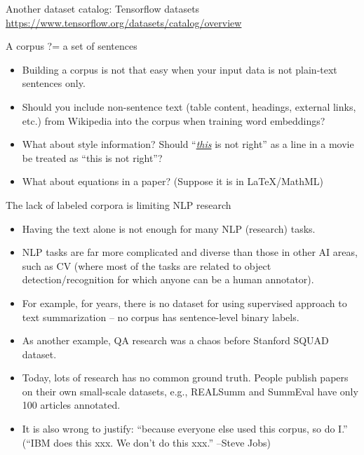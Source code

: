 \documentclass[11pt]{beamer}
\begin{document}
\begin{frame}{Another dataset catalog: Tensorflow datasets}
  \url{https://www.tensorflow.org/datasets/catalog/overview}
\end{frame}

\begin{frame}{A corpus ?= a set of sentences }
 \begin{itemize}
  \item Building a corpus is not that easy when your input data is not plain-text sentences only. 
  \item Should you include non-sentence text (table content, headings, external links, etc.) from Wikipedia into the corpus when training word embeddings? 
  \item What about style information? Should ``\underline{\textit{this}} is not right'' as a line in a movie be treated as ``this is not right''? 
  \item What about equations in a paper? (Suppose it is in \LaTeX/MathML) 
 \end{itemize}
\end{frame}

\begin{frame}{The lack of labeled corpora is limiting NLP research}
 \begin{itemize}[<+->]
  \item Having the text alone is not enough for many NLP (research) tasks. 
  \item NLP tasks are far more complicated and diverse than those in other AI areas, such as CV (where most of the tasks are related to object detection/recognition for which anyone can be a human annotator).
  \item For example, for years, there is no dataset for using supervised approach to text summarization -- no corpus has sentence-level binary labels. 
  \item As another example, QA research was a chaos before Stanford SQUAD dataset. 
  \item Today, lots of research has no common ground truth. People publish papers on their own small-scale datasets, e.g., REALSumm and SummEval have only 100 articles annotated.
  \item It is also wrong to justify: ``because everyone else used this corpus, so do I.'' (``IBM does this xxx. We don't do this xxx.'' --Steve Jobs)
 \end{itemize}
\end{frame}
\end{document}
